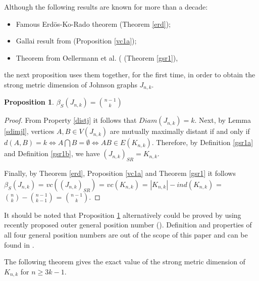 \documentclass[preprint,12pt]{elsarticle}
\newtheorem{pro}{Proposition}
\begin{document}
Although the following results are known for more than a decade:
\begin{itemize}
\item Famous Erd\"os-Ko-Rado theorem (Theorem \ref{erd});
\item Gallai result from \cite{vc1} (Proposition \ref{vc1a}); 
\item Theorem from Oellermann et al. (\cite{smetd2} (Theorem \ref{gsr1}),
\end{itemize}
the next proposition uses them together, for the first time,
in order to obtain the strong metric dimension of Johnson graphs $J_{n,k}$.

\begin{pro} \label{sdimj} $\beta_S(J_{n,k}) = \binom{n-1}{k}$ \end{pro}
\begin{proof}
From Property \ref{distj} it follows that $Diam(J_{n,k}) = k$. 
Next, by Lemma \ref{sdimjl}, vertices $A,B \in V(J_{n,k})$ are mutually maximally distant if and only if
 $d(A,B) = k \Leftrightarrow A \bigcap B = \emptyset \Leftrightarrow AB \in E(K_{n,k})$.
Therefore, by Definition \ref{gsr1a} and Definition \ref{gsr1b}, we have $(J_{n,k})_{SR} = K_{n,k}$.

Finally, by Theorem \ref{erd}, Proposition \ref{vc1a} and Theorem \ref{gsr1} 
it follows $\beta_S(J_{n,k})$ = $vc((J_{n,k})_{SR})$ =  $vc(K_{n,k})$ =
$|K_{n,k}| - ind(K_{n,k})$ = $\binom{n}{k} - \binom{n-1}{k-1}$ =
$\binom{n-1}{k}$.
\end{proof}

It should be noted that Proposition \ref{sdimj} alternatively could be proved by 
using recently proposed outer general position number (\cite{tian25}).
Definition and properties of all four general position numbers are out of the scope of this paper
and can be found in \cite{gpp26}.

The following theorem gives the exact value of the strong metric dimension of
$K_{n,k}$ for $n \ge 3k-1$.
\end{document}
